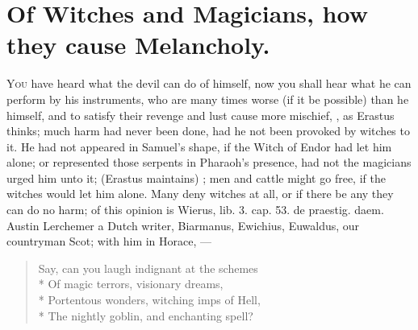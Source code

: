 {{%
\section[Witches and Magicians]{Of Witches and Magicians, how they cause Melancholy.}

\lettrine{Y}{ou} have heard what the devil can do of himself, now you shall hear
what he can perform by his instruments, who are many times worse (if it
be possible) than he himself, and to satisfy their revenge and lust
cause more mischief, , as Erastus thinks; much harm had never been
done, had he not been provoked by witches to it. He had not appeared in
Samuel's shape, if the Witch of Endor had let him alone; or represented
those serpents in Pharaoh's presence, had not the magicians urged him
unto it;  (Erastus
maintains) ; men and cattle might go free, if the
witches would let him alone. Many deny witches at all, or if there be
any they can do no harm; of this opinion is Wierus, lib. 3. cap. 53. \textlatin{de
praestig. daem.} Austin Lerchemer a Dutch writer, Biarmanus, Ewichius,
Euwaldus, our countryman Scot; with him in Horace,
---

\begin{verse}
Say, can you laugh indignant at the schemes\\*
Of magic terrors, visionary dreams,\\*
Portentous wonders, witching imps of Hell,\\*
The nightly goblin, and enchanting spell?
\end{verse}

}}
